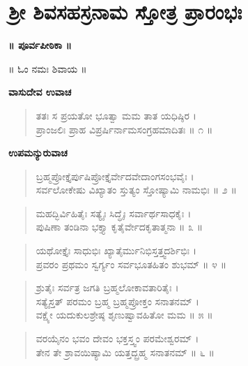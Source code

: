 
\chapter{ಶ್ರೀ ಶಿವಸಹಸ್ರನಾಮ ಸ್ತೋತ್ರ ಪ್ರಾರಂಭಃ}

\begin{center}
\textbf{॥ ಪೂರ್ವಪೀಠಿಕಾ ॥}
\end{center}

\begin{center}
॥ ಓಂ ನಮಃ ಶಿವಾಯ ॥
\end{center}

\begin{center}
\textbf{ವಾಸುದೇವ ಉವಾಚ}
\end{center}

\begin{verse}
ತತಃ ಸ ಪ್ರಯತೋ ಭೂತ್ವಾ ಮಮ ತಾತ ಯಧಿಷ್ಠಿರ ।\\ಪ್ರಾಂಜಲಿಃ ಪ್ರಾಹ ವಿಪ್ರರ್ಷಿರ್ನಾಮಸಂಗ್ರಹಮಾದಿತಃ \num{॥ ೧ ॥}
\end{verse}

\begin{center}
\textbf{ಉಪಮನ್ಯುರುವಾಚ}
\end{center}

\begin{verse}
ಬ್ರಹ್ಮಪ್ರೋಕ್ತೈರ್ಪುಷಿಪ್ರೋಕ್ತೈರ್ವೇದವೇದಾಂಗಸಂಭವೈಃ ।\\ಸರ್ವಲೋಕೇಷು ವಿಖ್ಯಾತಂ ಸ್ತುತ್ಯಂ ಸ್ತೋಷ್ಯಾಮಿ ನಾಮಭಿಃ \num{॥ ೨ ॥}
\end{verse}

\begin{verse}
ಮಹದ್ಭಿರ್ವಿಹಿತೈಃ ಸತ್ಯೈಃ ಸಿದ್ಧೈಃ ಸರ್ವಾರ್ಥಸಾಧಕೈಃ ।\\ಪುಷಿಣಾ ತಂಡಿನಾ ಭಕ್ತ್ಯಾ ಕೃತೈರ್ವೇದಕೃತಾತ್ಮನಾ \num{॥ ೩ ॥}
\end{verse}

\begin{verse}
ಯಥೋಕ್ತೈಃ ಸಾಧುಭಿಃ ಖ್ಯಾತೈರ್ಮುನಿಭಿಸ್ತತ್ತ್ವದರ್ಶಿಭಿಃ ।\\ಪ್ರವರಂ ಪ್ರಥಮಂ ಸ್ವರ್ಗ್ಯಂ ಸರ್ವಭೂತಹಿತಂ ಶುಭಮ್ \num{॥ ೪ ॥}
\end{verse}

\begin{verse}
ಶ್ರುತೈಃ ಸರ್ವತ್ರ ಜಗತಿ ಬ್ರಹ್ಮಲೋಕಾವತಾರಿತೈಃ ।\\ಸತ್ಯೈಸ್ತತ್ ಪರಮಂ ಬ್ರಹ್ಮ ಬ್ರಹ್ಮಪ್ರೋಕ್ತಂ ಸನಾತನಮ್ ।\\ವಕ್ಷ್ಯೇ ಯದುಕುಲಶ್ರೇಷ್ಠ ಶೃಣುಷ್ವಾವಹಿತೋ ಮಮ \num{॥ ೫ ॥}
\end{verse}

\begin{verse}
ವರಯೈನಂ ಭವಂ ದೇವಂ ಭಕ್ತಸ್ತ್ವಂ ಪರಮೇಶ್ವರಮ್ ।\\ತೇನ ತೇ ಶ್ರಾವಯಿಷ್ಯಾಮಿ ಯತ್ತದ್ಬ್ರಹ್ಮ ಸನಾತನಮ್ \num{॥ ೬ ॥}
\end{verse}

